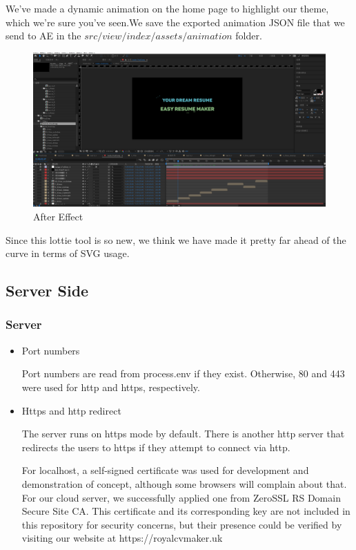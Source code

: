 \documentclass[11pt]{article}
\begin{document}
\begin{spacing}{1.0}
\begin{itemize}
We've made a dynamic animation on the home page to highlight our theme, which we're sure you've seen.We save the exported animation JSON file that we send to AE in the $src/view/index/assets/animation$ folder.
\begin{figure}[H]
	\centering
	\includegraphics[scale=0.2]{figures/ae.png}
	\caption{After Effect}
	\label{fig:6}
\end{figure}
Since this lottie tool is so new, we think we have made it pretty far ahead of the curve in terms of SVG usage.

	\end{itemize}
	\subsection{Server Side}
	\subsubsection{Server}
	
	\begin{itemize}
	

	\item Port numbers
	
	Port numbers are read from process.env if they exist. Otherwise, 80 and 443 were used for http and https, respectively. 
	
	\item Https and http redirect
	
	The server runs on https mode by default. There is another http server that redirects the users to https if they attempt to connect via http.
	
	For localhost, a self-signed certificate was used for development and demonstration of concept, although some browsers will complain about that.
	For our cloud server, we successfully applied one from ZeroSSL RS Domain Secure Site CA. This certificate and its corresponding key are not included in this repository for security concerns, but their presence could be verified by visiting our website at https://royalcvmaker.uk
	

\end{itemize}
\end{spacing}
\end{document}
